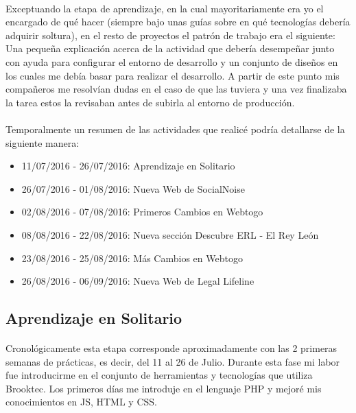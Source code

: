 \documentclass[10pt, a4paper,spanish]{article}
\begin{document}
        \paragraph{}
        Exceptuando la etapa de aprendizaje, en la cual mayoritariamente era yo el encargado de qué hacer (siempre bajo unas guías sobre en qué tecnologías debería adquirir soltura), en el resto de proyectos el patrón de trabajo era el siguiente: Una pequeña explicación acerca de la actividad que debería desempeñar junto con ayuda para configurar el entorno de desarrollo y un conjunto de diseños en los cuales me debía basar para realizar el desarrollo. A partir de este punto mis compañeros me resolvían dudas en el caso de que las tuviera y una vez finalizaba la tarea estos la revisaban antes de subirla al entorno de producción.


        \paragraph{}
        Temporalmente un resumen de las actividades que realicé podría detallarse de la siguiente manera:

        \begin{itemize}
            \item 11/07/2016 - 26/07/2016:  Aprendizaje en Solitario
            \item 26/07/2016 - 01/08/2016:  Nueva Web de SocialNoise
            \item 02/08/2016 - 07/08/2016:  Primeros Cambios en Webtogo
            \item 08/08/2016 - 22/08/2016:  Nueva sección Descubre ERL - El Rey León
            \item 23/08/2016 - 25/08/2016:  Más Cambios en Webtogo
            \item 26/08/2016 - 06/09/2016:  Nueva Web de Legal Lifeline
        \end{itemize}

        \subsection{Aprendizaje en Solitario}

            \paragraph{}
            Cronológicamente esta etapa corresponde aproximadamente con las 2 primeras semanas de prácticas, es decir, del 11 al 26 de Julio. Durante esta fase mi labor fue introducirme en el conjunto de herramientas y tecnologías que utiliza Brooktec. Los primeros días me introduje en el lenguaje PHP y mejoré mis conocimientos en JS, HTML y CSS.
\end{document}
